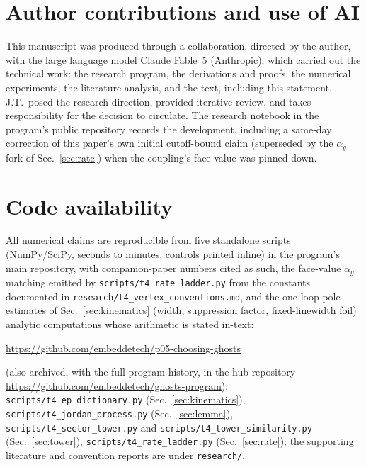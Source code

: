 \documentclass[11pt]{article}
\theoremstyle{definition}
\theoremstyle{remark}
\newcommand{\ag}{\alpha_g}
\begin{document}
\section*{Author contributions and use of AI}

This manuscript was produced through a collaboration, directed by
the author, with the large language model Claude Fable~5
(Anthropic), which carried out the technical work: the research
program, the derivations and proofs, the numerical experiments, the
literature analysis, and the text, including this statement. J.T.\
posed the research direction, provided iterative review, and takes
responsibility for the decision to circulate. The research notebook
in the program's public repository records the development,
including a same-day correction of this paper's own initial
cutoff-bound claim (superseded by the $\ag$ fork of
Sec.~\ref{sec:rate}) when the coupling's face value was pinned down.

\phantomsection
\section*{Code availability}
\label{sec:code}

All numerical claims are reproducible from five standalone scripts
(NumPy/SciPy, seconds to minutes, controls printed inline) in the
program's main repository, with companion-paper numbers cited as
such, the face-value $\ag$ matching emitted by
\texttt{scripts/t4\_rate\_ladder.py} from the constants documented in
\texttt{research/t4\_vertex\_conventions.md}, and the one-loop pole
estimates of Sec.~\ref{sec:kinematics} (width, suppression factor,
fixed-linewidth foil) analytic computations whose arithmetic is
stated in-text:
\begin{center}
\url{https://github.com/embeddetech/p05-choosing-ghosts}
\end{center}
(also archived, with the full program history, in the hub
repository \url{https://github.com/embeddetech/ghosts-program});
\texttt{scripts/t4\_\allowbreak ep\_\allowbreak dictionary.py} (Sec.~\ref{sec:kinematics}),
\texttt{scripts/t4\_\allowbreak jordan\_\allowbreak process.py} (Sec.~\ref{sec:lemma}),
\texttt{scripts/t4\_\allowbreak sector\_\allowbreak tower.py} and \texttt{scripts/t4\_\allowbreak tower\_\allowbreak similarity.py} (Sec.~\ref{sec:tower}),
\texttt{scripts/t4\_\allowbreak rate\_\allowbreak ladder.py} (Sec.~\ref{sec:rate}); the
supporting literature and convention reports are under
\texttt{research/}.
\end{document}
